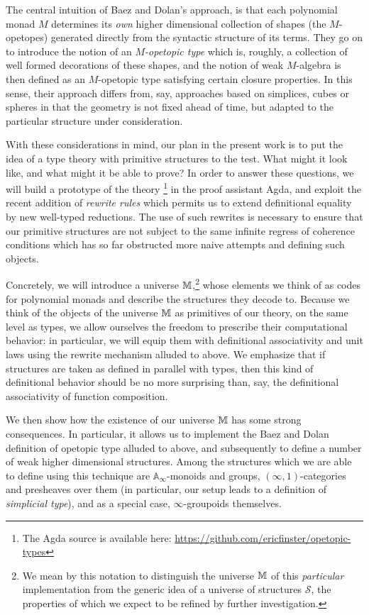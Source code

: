 The central intuition of Baez and Dolan's approach, is that each
polynomial monad $M$ determines its \emph{own} higher dimensional
collection of shapes (the $M$-opetopes) generated directly from the
syntactic structure of its terms.  They go on to introduce the notion
of an \emph{$M$-opetopic type} which is, roughly, a collection of well
formed decorations of these shapes, and the notion of weak $M$-algebra
is then defined as an $M$-opetopic type satisfying certain closure
properties.  In this sense, their approach differs from, say,
approaches based on simplices, cubes or spheres in that the geometry
is not fixed ahead of time, but adapted to the particular structure
under consideration.

With these considerations in mind, our plan in the present work is to
put the idea of a type theory with primitive structures to the test.
What might it look like, and what might it be able to prove?  In order
to answer these questions, we will build a prototype of the theory
\footnote{The Agda source is available here:
  \url{https://github.com/ericfinster/opetopic-types}} in the proof
assistant Agda, and exploit the recent addition of \emph{rewrite
  rules} \cite{cockx:hal-02901011} which permits us to extend
definitional equality by new well-typed reductions.  The use of such
rewrites is necessary to ensure that our primitive structures are not
subject to the same infinite regress of coherence conditions which has
so far obstructed more naive attempts and defining such objects.


Concretely, we will introduce a universe $\mathbb{M}$,\footnote{We mean by
  this notation to distinguish the universe $\mathbb{M}$ of this
  \emph{particular} implementation from the generic idea of a universe
  of structures $\mathcal{S}$, the properties of which we expect to be
  refined by further investigation.} whose elements we think of as
codes for polynomial monads and describe the structures they decode
to.  Because we think of the objects of the universe $\mathbb{M}$ as
primitives of our theory, on the same level as types, we allow
ourselves the freedom to prescribe their computational behavior: in
particular, we will equip them with definitional associativity and
unit laws using the rewrite mechanism alluded to above.  We emphasize
that if structures are taken as defined in parallel with types, then
this kind of definitional behavior should be no more surprising than,
say, the definitional associativity of function composition.

We then show how the existence of our universe $\mathbb{M}$ has some strong
consequences.  In particular, it allows us to implement the Baez and
Dolan definition of opetopic type alluded to above, and subsequently
to define a number of weak higher dimensional structures.  Among the
structures which we are able to define using this technique are
$\mathbb{A}_\infty$-monoids and groups, $(\infty,1)$-categories and
presheaves over them (in particular, our setup leads to a definition
of \emph{simplicial type}), and as a special case, $\infty$-groupoids
themselves.

